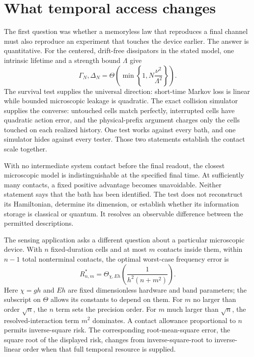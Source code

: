 \documentclass[11pt,a4paper]{article}
\numberwithin{equation}{section}
\theoremstyle{remark}
\begin{document}
\section{What temporal access changes}
\label{sec:synthesis}

The first question was whether a memoryless law that reproduces a final
channel must also reproduce an experiment that touches the device earlier.
The answer is quantitative. For the centered, drift-free dissipators in
the stated model, one intrinsic lifetime and a strength bound $\Lambda$
give
\begin{equation}
 \Gamma_N,\Delta_N
 =\Theta\!\left(\min\left\{1,N\frac{\nu^2}{\Lambda^2}\right\}\right).
\end{equation}
The survival test supplies the universal direction: short-time Markov
loss is linear while bounded microscopic leakage is quadratic. The exact
collision simulator supplies the converse: untouched cells match perfectly,
interrupted cells have quadratic action error, and the physical-prefix
argument charges only the cells touched on each realized history. One test
works against every bath, and one simulator hides against every tester.
Those two statements establish the contact scale together.

With no intermediate system contact before the final readout, the closest
microscopic model is indistinguishable at the specified final time.
At sufficiently many
contacts, a fixed positive advantage becomes unavoidable. Neither statement
says that the bath has been identified. The test does not reconstruct its
Hamiltonian, determine its dimension, or establish whether its information
storage is classical or quantum. It resolves an observable difference
between the permitted descriptions.

The sensing application asks a different question about a particular
microscopic device. With $n$ fixed-duration cells and at most $m$ contacts
inside them, within $n-1$ total nonterminal contacts, the optimal worst-case
frequency error is
\begin{equation}
 R^*_{n,m}=\Theta_{\chi,Eh}\!\left(\frac1{h^2(n+m^2)}\right).
\end{equation}
Here $\chi=gh$ and $Eh$ are fixed dimensionless hardware and band parameters;
the subscript on $\Theta$ allows its constants to depend on them. For
$m$ no larger than order $\sqrt n$, the $n$ term sets the precision order.
For $m$ much larger than $\sqrt n$, the resolved-interaction term $m^2$
dominates. A contact allowance proportional to $n$ permits inverse-square
risk. The corresponding root-mean-square error, the square root of the
displayed risk, changes from inverse-square-root to inverse-linear order
when that full temporal resource is supplied.
\end{document}
